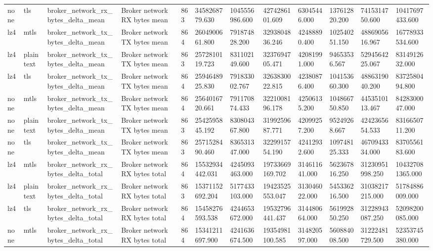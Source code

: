 \begin{longtable}{llllllllllll}
none & tls & broker\_network\_rx\_bytes\_delta\_mean & Broker network RX bytes mean & 863 & 3458268779.630 & 1045556986.600 & 4274286101.609 & 63045446.000 & 137612820.200 & 7415314750.600 & 10417697433.600 \\
lz4 & mtls & broker\_network\_tx\_bytes\_delta\_mean & Broker network TX bytes mean & 864 & 2604900661.800 & 791874828.200 & 3293804836.246 & 42488890.400 & 102540251.150 & 4886905616.967 & 16778933534.600 \\
lz4 & plaintext & broker\_network\_tx\_bytes\_delta\_mean & Broker network TX bytes mean & 863 & 2572810119.723 & 831102149.600 & 3237694705.471 & 42081991.000 & 94653536.567 & 5294564225.067 & 8314912632.000 \\
lz4 & tls & broker\_network\_tx\_bytes\_delta\_mean & Broker network TX bytes mean & 864 & 2594648925.830 & 791833002.767 & 3263830022.815 & 42380876.400 & 104153660.300 & 4886319040.200 & 8372580494.800 \\
none & mtls & broker\_network\_tx\_bytes\_delta\_mean & Broker network TX bytes mean & 864 & 2564016720.661 & 791170874.433 & 3221008196.178 & 42506135.200 & 104866750.850 & 4453510113.467 & 8428300047.000 \\
none & plaintext & broker\_network\_tx\_bytes\_delta\_mean & Broker network TX bytes mean & 863 & 2542595845.192 & 830804367.800 & 3199259687.771 & 42099257.200 & 95249268.667 & 4242365654.533 & 8316650711.200 \\
none & tls & broker\_network\_tx\_bytes\_delta\_mean & Broker network TX bytes mean & 863 & 2571528490.460 & 836531347.000 & 3229915754.190 & 42412932.600 & 109748125.333 & 4670943334.000 & 8370556183.600 \\
lz4 & mtls & broker\_network\_rx\_bytes\_delta\_total & Broker network RX bytes total & 864 & 15532934442.031 & 4245093463.000 & 19733669169.702 & 314611641.000 & 562367816.250 & 31230951998.250 & 104327081365.000 \\
lz4 & plaintext & broker\_network\_rx\_bytes\_delta\_total & Broker network RX bytes total & 863 & 15371152692.204 & 5177433103.000 & 19423525553.047 & 313046022.000 & 545336216.500 & 31038217215.000 & 51784886009.000 \\
lz4 & tls & broker\_network\_rx\_bytes\_delta\_total & Broker network RX bytes total & 864 & 15458276593.538 & 4244653672.000 & 19532796441.437 & 314480664.000 & 561992850.250 & 31228943087.250 & 52098200085.000 \\
none & mtls & broker\_network\_rx\_bytes\_delta\_total & Broker network RX bytes total & 864 & 15341211697.900 & 4241636674.500 & 19354981100.585 & 314820597.000 & 560884008.500 & 31222481729.500 & 52353745380.000 \\

\end{longtable}
